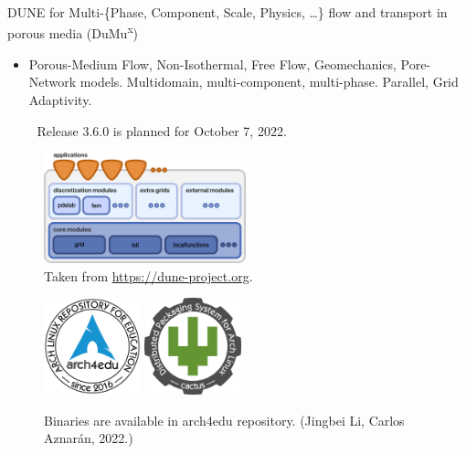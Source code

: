 \begin{frame}
\begin{alertblock}{DUNE for Multi-\{Phase, Component, Scale, Physics, \ldots\} flow and transport in porous media (DuMu\textsuperscript{x})}
\begin{itemize}
			      {🎉}
			      DUNE Release 2.9.0 is planned for end of October 2022.

			\item

			      Porous-Medium Flow, Non-Isothermal, Free Flow, Geomechanics, Pore-Network models.
			      Multidomain, multi-component, multi-phase. Parallel, Grid Adaptivity.

				      {🎉}
			      Release 3.6.0 is planned for October 7, 2022.

		\end{itemize}
	\end{alertblock}

	\begin{minipage}{0.45\textwidth}
		\begin{figure}[ht!]
			\centering
			\includegraphics[height=3.2cm]{dunedesign}
			\caption{Taken from \url{https://dune-project.org}.}
		\end{figure}
	\end{minipage}\quad
	\begin{minipage}{0.45\textwidth}
		\begin{figure}[ht!]
			\centering %
			\href{https://github.com/arch4edu/arch4edu}{\includegraphics[height=2.8cm]{arch4edu}}\quad\quad %
			\href{https://github.com/arch4edu/cactus}{\includegraphics[height=2.8cm]{cactus.png}}
			\caption{Binaries are available in arch4edu repository. (Jingbei Li, Carlos Aznarán, 2022.)}
		\end{figure}
	\end{minipage}

\end{frame}

